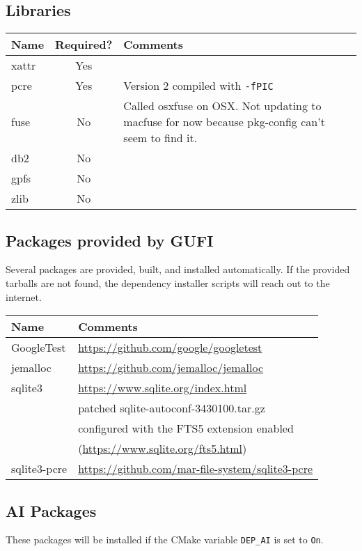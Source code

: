 \subsection{Libraries}
\begin{center}
\begin{tabularx}{\textwidth}{| l | c | X |}
  \hline
  Name & Required? & Comments \\
  \hline
  xattr & Yes & \\
  \hline
  pcre & Yes & Version 2 compiled with \texttt{-fPIC} \\
  \hline
  fuse & No & Called osxfuse on OSX. Not updating to macfuse for now
  because pkg-config can't seem to find it. \\
  \hline
  db2 & No & \\
  \hline
  gpfs & No & \\
  \hline
  zlib & No & \\
  \hline
\end{tabularx}
\end{center}

\subsection{Packages provided by GUFI}
Several packages are provided, built, and installed automatically. If
the provided tarballs are not found, the dependency installer scripts
will reach out to the internet.

\begin{center}
\begin{tabularx}{\textwidth}{| l | X |}
  \hline
  Name & Comments \\
  \hline
  GoogleTest & \url{https://github.com/google/googletest} \\
  \hline
  jemalloc & \url{https://github.com/jemalloc/jemalloc} \\
  \hline
  sqlite3 & \url{https://www.sqlite.org/index.html} \\
  & patched sqlite-autoconf-3430100.tar.gz \\
  & configured with the FTS5 extension enabled \\
  & (\url{https://www.sqlite.org/fts5.html}) \\
  \hline
  sqlite3-pcre & \url{https://github.com/mar-file-system/sqlite3-pcre}
  \\
  \hline
\end{tabularx}
\end{center}

\subsection{AI Packages}
These packages will be installed if the CMake variable
\texttt{DEP\_AI} is set to \texttt{On}.

